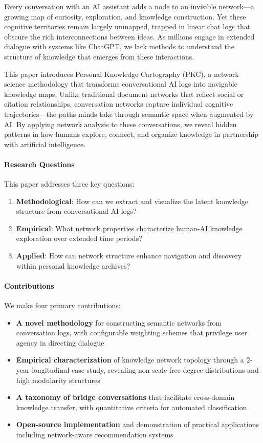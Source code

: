 \documentclass[10pt, a4paper]{article}
\begin{document}
Every conversation with an AI assistant adds a node to an invisible network—a growing map of curiosity, exploration, and knowledge construction. Yet these cognitive territories remain largely unmapped, trapped in linear chat logs that obscure the rich interconnections between ideas. As millions engage in extended dialogue with systems like ChatGPT, we lack methods to understand the structure of knowledge that emerges from these interactions.

This paper introduces Personal Knowledge Cartography (PKC), a network science methodology that transforms conversational AI logs into navigable knowledge maps. Unlike traditional document networks that reflect social or citation relationships, conversation networks capture individual cognitive trajectories—the paths minds take through semantic space when augmented by AI. By applying network analysis to these conversations, we reveal hidden patterns in how humans explore, connect, and organize knowledge in partnership with artificial intelligence.

\paragraph{Research Questions}
This paper addresses three key questions:
\begin{enumerate}
    \item \textbf{Methodological}: How can we extract and visualize the latent knowledge structure from conversational AI logs?
    \item \textbf{Empirical}: What network properties characterize human-AI knowledge exploration over extended time periods?
    \item \textbf{Applied}: How can network structure enhance navigation and discovery within personal knowledge archives?
\end{enumerate}

\paragraph{Contributions}
We make four primary contributions:
\begin{itemize}
    \item \textbf{A novel methodology} for constructing semantic networks from conversation logs, with configurable weighting schemes that privilege user agency in directing dialogue
    \item \textbf{Empirical characterization} of knowledge network topology through a 2-year longitudinal case study, revealing non-scale-free degree distributions and high modularity structures
    \item \textbf{A taxonomy of bridge conversations} that facilitate cross-domain knowledge transfer, with quantitative criteria for automated classification
    \item \textbf{Open-source implementation} and demonstration of practical applications including network-aware recommendation systems
\end{itemize}
\end{document}
